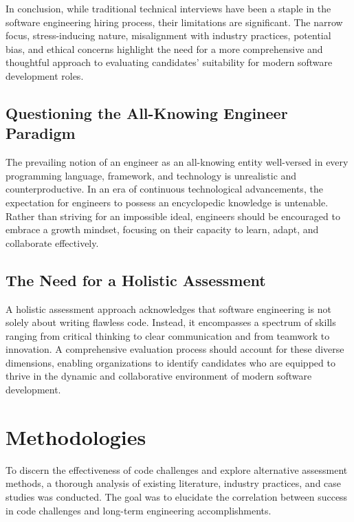 \documentclass[
    a4paper, %
    10pt, %
    unnumberedsections, %
    twoside, %
]{LTJournalArticle}
\begin{document}
In conclusion, while traditional technical interviews have been a staple in the software engineering hiring process, their limitations are significant. The narrow focus, stress-inducing nature, misalignment with industry practices, potential bias, and ethical concerns highlight the need for a more comprehensive and thoughtful approach to evaluating candidates' suitability for modern software development roles.



\subsection{Questioning the All-Knowing Engineer Paradigm}

The prevailing notion of an engineer as an all-knowing entity well-versed in every programming language, framework, and technology is unrealistic and counterproductive. In an era of continuous technological advancements, the expectation for engineers to possess an encyclopedic knowledge is untenable. Rather than striving for an impossible ideal, engineers should be encouraged to embrace a growth mindset, focusing on their capacity to learn, adapt, and collaborate effectively.

\subsection{The Need for a Holistic Assessment}

A holistic assessment approach acknowledges that software engineering is not solely about writing flawless code. Instead, it encompasses a spectrum of skills ranging from critical thinking to clear communication and from teamwork to innovation. A comprehensive evaluation process should account for these diverse dimensions, enabling organizations to identify candidates who are equipped to thrive in the dynamic and collaborative environment of modern software development.


\section{Methodologies}

To discern the effectiveness of code challenges and explore alternative assessment methods, a thorough analysis of existing literature, industry practices, and case studies was conducted. The goal was to elucidate the correlation between success in code challenges and long-term engineering accomplishments.
\end{document}
